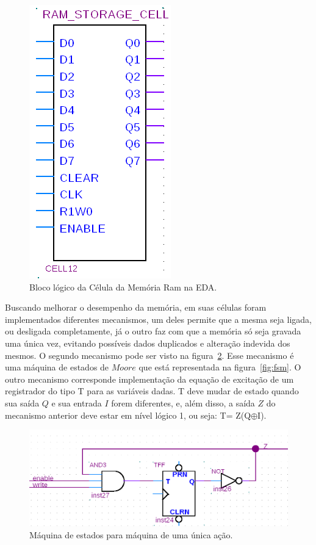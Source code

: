 \documentclass[12pt]{article}
\begin{document}
\begin{figure}[h]
\centering
\includegraphics[width=.3\textwidth]{img/celulamemoria.png}
\caption{Bloco lógico da Célula da Memória Ram na EDA.}
\label{fig:celulamemoria}
\end{figure}

Buscando melhorar o desempenho da memória, em suas células foram implementados diferentes mecanismos, um deles permite que a mesma seja ligada, ou desligada completamente, já o outro faz com que a memória só seja gravada uma única vez, evitando possíveis dados duplicados e alteração indevida dos mesmos. O segundo mecanismo pode ser visto na figura~\ref{fig:ff1}. Esse mecanismo é uma máquina de estados de $Moore$ que está representada na figura~\ref{fig:fsm}. O outro mecanismo corresponde implementação da equação de excitação de um registrador do tipo T para as variáveis dadas. T deve mudar de estado quando sua saída $Q$ e sua entrada $I$ forem diferentes, e, além disso, a saída $Z$ do mecanismo anterior deve estar em nível lógico 1, ou seja: T= Z(Q$\oplus$I).



\begin{figure}[h]
\centering
\includegraphics[width=.8\textwidth]{img/ff1.png}
\caption{Máquina de estados para máquina de uma única ação.}
\label{fig:ff1}
\end{figure}
\end{document}
